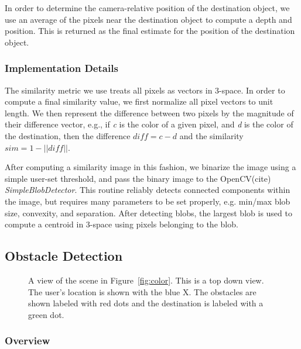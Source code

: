 In order to determine the camera-relative position of the destination object,
we use an average of the pixels near the destination object to compute
a depth and position. This is returned as the final estimate for the
position of the destination object. 

\subsubsection{Implementation Details}
\label{sec:technical-dest-impl}

The similarity metric we use treats all pixels as vectors in 3-space. In order
to compute a final similarity value, we first normalize all pixel vectors
to unit length. We then represent the difference between two pixels by the
magnitude of their difference vector, e.g., if \emph{c} is the color of a
given pixel, and \emph{d} is the color of the destination, then the difference
\begin{math} diff = c - d \end{math} and the similarity \begin{math} 
sim = 1 - ||diff|| \end{math}. 

After computing a similarity image in this fashion, we binarize the image
using a simple user-set threshold, and pass the binary image to the OpenCV(cite)
\emph{SimpleBlobDetector}. This routine reliably detects connected components
within the image, but requires many parameters to be set properly, e.g.
min/max blob size, convexity, and separation. After detecting blobs, the 
largest blob is used to compute a centroid in 3-space using pixels belonging 
to the blob.

\subsection{Obstacle Detection}
\label{sec:technical-obs}

\begin{figure}
\caption{A view of the scene in Figure~\ref{fig:color}. This is a top down view.
  The user's location is shown with the blue X. The obstacles are shown labeled
  with red dots and the destination is labeled with a green dot.}
\label{fig:obstacle}
\end{figure}

\subsubsection{Overview}
\label{sec:technical-obs-overview}

